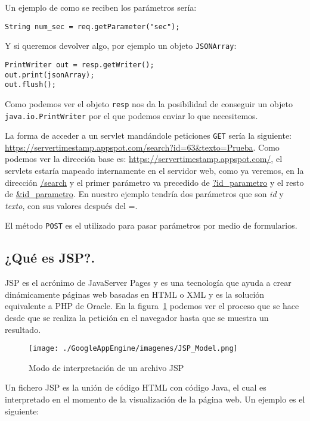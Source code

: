 Un ejemplo de como se reciben los parámetros sería: 

\begin{lstlisting}[style=Java]  
String num_sec = req.getParameter("sec");
\end{lstlisting}

Y si queremos devolver algo, por ejemplo un objeto \lstinline{JSONArray}:

\begin{lstlisting}[style=Java]   
PrintWriter out = resp.getWriter();
out.print(jsonArray);
out.flush();
\end{lstlisting}

Como podemos ver el objeto \lstinline{resp} nos da la posibilidad de conseguir un objeto \lstinline{java.io.PrintWriter} por el que podemos enviar lo que necesitemos.

La forma de acceder a un servlet mandándole peticiones \lstinline{GET} sería la siguiente: \url{https://servertimestamp.appspot.com/search?id=63&texto=Prueba}. Como podemos ver la dirección base es: \url{https://servertimestamp.appspot.com/}, el servlets estaría mapeado internamente en el servidor web, como ya veremos, en la dirección \url{/search} y el primer parámetro va precedido de \url{?id\_parametro} y el resto de \url{\&id\_parametro}. En nuestro ejemplo tendría dos parámetros que son \textit{id} y \textit{texto}, con sus valores después del =.

El método \lstinline{POST} es el utilizado para pasar parámetros por medio de formularios.

\subsection{¿Qué es JSP?.}
JSP es el acrónimo de JavaServer Pages y es una tecnología que ayuda a crear dinámicamente páginas web basadas en HTML o XML y es la solución equivalente a PHP de Oracle. En la figura~\ref{fig:modoJSP} podemos ver el proceso que se hace desde que se realiza la petición en el navegador hasta que se muestra un resultado.

\begin{figure}
  \centering
    \texttt{[image: ./GoogleAppEngine/imagenes/JSP\_Model.png]}
  \caption{Modo de interpretación de un archivo JSP}
  \label{fig:modoJSP}
\end{figure}

Un fichero JSP es la unión de código HTML con código Java, el cual es interpretado en el momento de la visualización de la página web. Un ejemplo es el siguiente:
 

